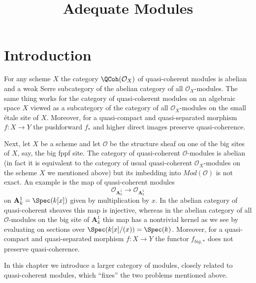 

%


\title{Adequate Modules}


\maketitle

\label{section-phantom}

\tableofcontents

\section{Introduction}
\label{section-introduction}

\noindent
For any scheme $X$ the category $\QCoh(\mathcal{O}_X)$
of quasi-coherent modules is abelian and a weak Serre subcategory
of the abelian category of all $\mathcal{O}_X$-modules. The same
thing works for the category of quasi-coherent modules on
an algebraic space $X$ viewed as a subcategory of the category
of all $\mathcal{O}_X$-modules on the small \'etale site of $X$.
Moreover, for a quasi-compact and quasi-separated morphism
$f : X \to Y$ the pushforward $f_*$ and higher direct images
preserve quasi-coherence.

\medskip\noindent
Next, let $X$ be a scheme and let $\mathcal{O}$ be the structure
sheaf on one of the big sites of $X$, say, the big fppf site.
The category of quasi-coherent $\mathcal{O}$-modules is abelian
(in fact it is equivalent to the category of usual quasi-coherent
$\mathcal{O}_X$-modules on the scheme $X$ we mentioned above)
but its imbedding into $\textit{Mod}(\mathcal{O})$ is not exact.
An example is the map of quasi-coherent modules
$$
\mathcal{O}_{\mathbf{A}^1_k}
\longrightarrow
\mathcal{O}_{\mathbf{A}^1_k}
$$
on $\mathbf{A}^1_k = \Spec(k[x])$ given by multiplication by $x$.
In the abelian category of quasi-coherent sheaves this map is injective,
whereas in the abelian category of all $\mathcal{O}$-modules on the
big site of $\mathbf{A}^1_k$ this map has a nontrivial kernel as we
see by evaluating on sections over $\Spec(k[x]/(x)) = \Spec(k)$.
Moreover, for a quasi-compact and quasi-separated morphism
$f : X \to Y$ the functor $f_{big, *}$ does not preserve quasi-coherence.

\medskip\noindent
In this chapter we introduce a larger category of modules, closely related
to quasi-coherent modules, which ``fixes'' the two problems mentioned above.






